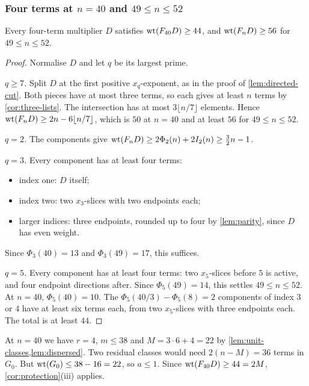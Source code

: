 \subsubsection*{Four terms at \texorpdfstring{$n=40$}{n = 40} and \texorpdfstring{$49\le n\le52$}{49 <= n <= 52}}

\begin{lemma}\label{lem:four-exceptions}
Every four-term multiplier $D$ satisfies $\operatorname{wt}(F_{40}D)\ge44$, and $\operatorname{wt}(F_nD)\ge56$ for $49\le n\le52$.
\end{lemma}

\begin{proof}
Normalise $D$ and let $q$ be its largest prime.

\emph{$q\ge7$.} Split $D$ at the first positive $x_q$-exponent, as in the proof of \cref{lem:directed-cut}. Both pieces have at most three terms, so each gives at least $n$ terms by \cref{cor:three-lists}. The intersection has at most $3\lfloor n/7\rfloor$ elements. Hence $\operatorname{wt}(F_nD)\ge2n-6\lfloor n/7\rfloor$, which is $50$ at $n=40$ and at least $56$ for $49\le n\le52$.

\emph{$q=2$.} The components give $\operatorname{wt}(F_nD)\ge2\Phi_2(n)+2I_2(n)\ge\frac32n-1$.

\emph{$q=3$.} Every component has at least four terms:
\begin{itemize}
\item index one: $D$ itself;
\item index two: two $x_3$-slices with two endpoints each;
\item larger indices: three endpoints, rounded up to four by \cref{lem:parity}, since $D$ has even weight.
\end{itemize}
Since $\Phi_3(40)=13$ and $\Phi_3(49)=17$, this suffices.

\emph{$q=5$.} Every component has at least four terms: two $x_5$-slices before $5$ is active, and four endpoint directions after. Since $\Phi_5(49)=14$, this settles $49\le n\le52$. At $n=40$, $\Phi_5(40)=10$. The $\Phi_5(40/3)-\Phi_5(8)=2$ components of index $3$ or $4$ have at least six terms each, from two $x_5$-slices with three endpoints each. The total is at least $44$.
\end{proof}

At $n=40$ we have $r=4$, $m\le38$ and $M=3\cdot6+4=22$ by \cref{lem:unit-classes,lem:dispersed}. Two residual classes would need $2(n-M)=36$ terms in $G_0$. But $\operatorname{wt}(G_0)\le38-16=22$, so $a\le1$. Since $\operatorname{wt}(F_{40}D)\ge44=2M$, \cref{cor:protection}(iii) applies.

